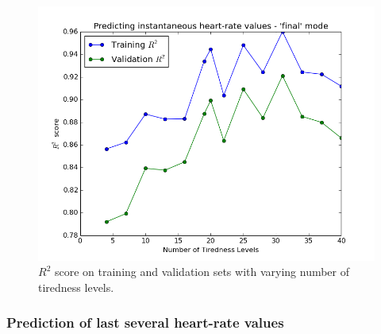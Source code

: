 \documentclass{acm_proc_article-sp}
\begin{document}
\begin{figure}[h]
\centering
\includegraphics[scale=0.4]{../src/plots/r2_vs_num_tiredness_levels}
\caption{\label{figR2vsTirednessLevels} $R^2$ score on training and validation sets with varying number of tiredness levels.}
\end{figure}

\subsubsection{Prediction of last several heart-rate values}
\end{document}
